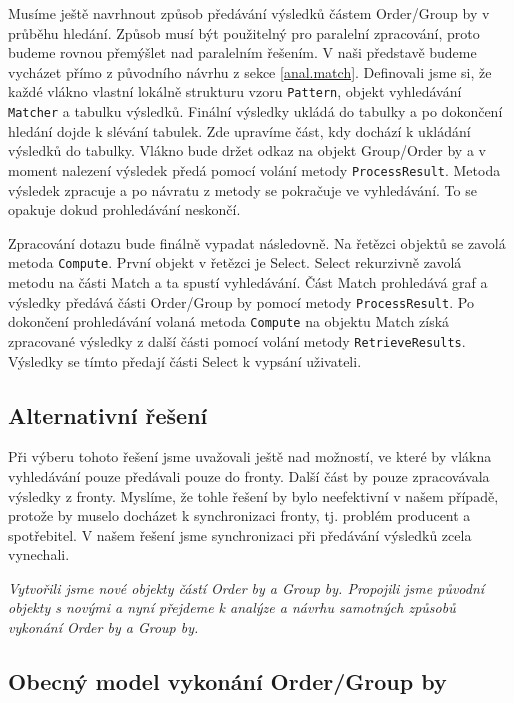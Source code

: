 Musíme ještě navrhnout způsob předávání výsledků částem Order/Group by v průběhu hledání.
Způsob musí být použitelný pro paralelní zpracování, proto budeme rovnou přemýšlet nad paralelním řešením.
V naši představě budeme vycházet přímo z původního návrhu z sekce \ref{anal.match}.
Definovali jsme si, že každé vlákno vlastní lokálně strukturu vzoru \texttt{Pattern}, objekt vyhledávání \texttt{Matcher} a tabulku výsledků.
Finální výsledky ukládá do tabulky a po dokončení hledání dojde k slévání tabulek.
Zde upravíme část, kdy dochází k ukládání výsledků do tabulky.
Vlákno bude držet odkaz na objekt Group/Order by a v moment nalezení výsledek předá pomocí volání metody \texttt{ProcessResult}.
Metoda výsledek zpracuje a po návratu z metody se pokračuje ve vyhledávání.
To se opakuje dokud prohledávání neskončí.

Zpracování dotazu bude finálně vypadat následovně.
Na řetězci objektů se zavolá metoda \texttt{Compute}.
První objekt v řetězci je Select.
Select rekurzivně zavolá metodu na části Match a ta spustí vyhledávání.
Část Match prohledává graf a výsledky předává části Order/Group by pomocí metody \texttt{ProcessResult}.
Po dokončení prohledávání volaná metoda \texttt{Compute} na objektu Match získá zpracované výsledky z další části pomocí volání metody \texttt{RetrieveResults}.
Výsledky se tímto předají části Select k vypsání uživateli. 

\subsection{Alternativní řešení}

Při výberu tohoto řešení jsme uvažovali ještě nad možností, ve které by vlákna vyhledávání pouze předávali pouze do fronty.
Další část by pouze zpracovávala výsledky z fronty.
Myslíme, že tohle řešení by bylo neefektivní v našem případě, protože by muselo docházet k synchronizaci fronty, tj. problém producent a spotřebitel.
V našem řešení jsme synchronizaci při předávání výsledků zcela vynechali.

\bigskip
\textit{
Vytvořili jsme nové objekty částí Order by a Group by.
Propojili jsme původní objekty s novými a nyní přejdeme k analýze a návrhu samotných způsobů vykonání Order by a Group by.}

\subsection{Obecný model vykonání Order/Group by}

